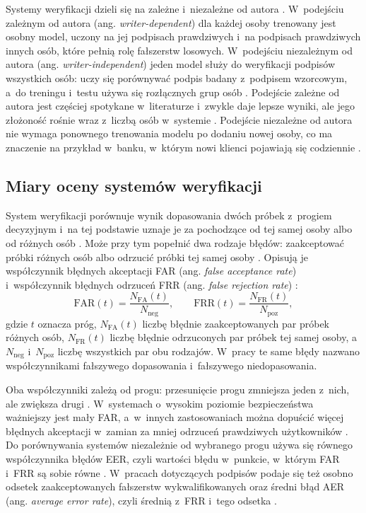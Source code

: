 \documentclass[12pt, twoside, openright]{article}
\begin{document}
Systemy weryfikacji dzieli się na zależne i~niezależne od autora \cite{hafemann2017review}.
W~podejściu zależnym od autora (ang. \textit{writer-dependent}) dla każdej osoby trenowany jest osobny model, uczony na jej podpisach prawdziwych i~na podpisach prawdziwych innych osób, które pełnią rolę fałszerstw losowych.
W~podejściu niezależnym od autora (ang. \textit{writer-independent}) jeden model służy do weryfikacji podpisów wszystkich osób: uczy się porównywać podpis badany z~podpisem wzorcowym, a~do treningu i~testu używa się rozłącznych grup osób \cite{hafemann2017review}.
Podejście zależne od autora jest częściej spotykane w~literaturze i~zwykle daje lepsze wyniki, ale jego złożoność rośnie wraz z~liczbą osób w~systemie \cite{hafemann2017features}.
Podejście niezależne od autora nie wymaga ponownego trenowania modelu po dodaniu nowej osoby, co ma znaczenie na przykład w~banku, w~którym nowi klienci pojawiają się codziennie \cite{dey2017}.

\subsection{Miary oceny systemów weryfikacji}
\label{Subsec:miary}

System weryfikacji porównuje wynik dopasowania dwóch próbek z~progiem decyzyjnym i~na tej podstawie uznaje je za pochodzące od tej samej osoby albo od różnych osób \cite{jain2004}.
Może przy tym popełnić dwa rodzaje błędów: zaakceptować próbki różnych osób albo odrzucić próbki tej samej osoby \cite{jain2004}.
Opisują je współczynnik błędnych akceptacji FAR (ang. \textit{false acceptance rate}) i~współczynnik błędnych odrzuceń FRR (ang. \textit{false rejection rate}) \cite{kalera2004}:
\begin{equation}
	\mathrm{FAR}(t) = \frac{N_{\mathrm{FA}}(t)}{N_{\mathrm{neg}}}, \qquad
	\mathrm{FRR}(t) = \frac{N_{\mathrm{FR}}(t)}{N_{\mathrm{poz}}},
	\label{Eq:far_frr}
\end{equation}
gdzie $t$ oznacza próg, $N_{\mathrm{FA}}(t)$ liczbę błędnie zaakceptowanych par próbek różnych osób, $N_{\mathrm{FR}}(t)$ liczbę błędnie odrzuconych par próbek tej samej osoby, a~$N_{\mathrm{neg}}$ i~$N_{\mathrm{poz}}$ liczbę wszystkich par obu rodzajów.
W~pracy \cite{jain2004} te same błędy nazwano współczynnikami fałszywego dopasowania i~fałszywego niedopasowania.

Oba współczynniki zależą od progu: przesunięcie progu zmniejsza jeden z~nich, ale zwiększa drugi \cite{jain2004}.
W~systemach o~wysokim poziomie bezpieczeństwa ważniejszy jest mały FAR, a~w~innych zastosowaniach można dopuścić więcej błędnych akceptacji w~zamian za mniej odrzuceń prawdziwych użytkowników \cite{jain2004}.
Do porównywania systemów niezależnie od wybranego progu używa się równego współczynnika błędów EER, czyli wartości błędu w~punkcie, w~którym FAR i~FRR są sobie równe \cite{kalera2004}.
W~pracach dotyczących podpisów podaje się też osobno odsetek zaakceptowanych fałszerstw wykwalifikowanych oraz średni błąd AER (ang. \textit{average error rate}), czyli średnią z~FRR i~tego odsetka \cite{hafemann2017review}.
\end{document}
